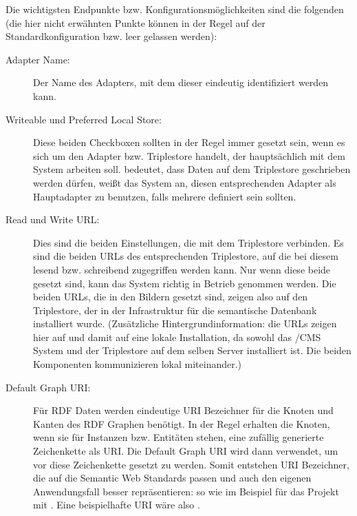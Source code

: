 Die wichtigsten Endpunkte bzw. Konfigurationsmöglichkeiten sind die folgenden (die hier nicht erwähnten Punkte können in der Regel auf der Standardkonfiguration bzw. leer gelassen werden):

\begin{description}
	\item[Adapter Name:] Der Name des Adapters, mit dem dieser eindeutig identifiziert werden kann.
	\item[Writeable und Preferred Local Store:] Diese beiden Checkboxen sollten in der Regel immer gesetzt sein, wenn es sich um den Adapter bzw. Triplestore handelt, der hauptsächlich mit dem System arbeiten soll.  bedeutet, dass Daten auf dem Triplestore geschrieben werden dürfen,  weißt das System an, diesen entsprechenden Adapter als Hauptadapter zu benutzen, falls mehrere definiert sein sollten.
	\item[Read und Write URL:] Dies sind die beiden Einstellungen, die \wisski mit dem Triplestore verbinden. Es sind die beiden URLs des entsprechenden Triplestore, auf die bei diesem lesend bzw. schreibend zugegriffen werden kann. Nur wenn diese beide gesetzt sind, kann das System richtig in Betrieb genommen werden. Die beiden URLs, die in den Bildern gesetzt sind, zeigen also auf den Triplestore, der in der Infrastruktur für die semantische Datenbank installiert wurde. (Zusätzliche Hintergrundinformation: die URLs zeigen hier auf  und damit auf eine lokale Installation, da sowohl das \wisski/CMS System und der Triplestore auf dem selben Server installiert ist. Die beiden Komponenten kommunizieren lokal miteinander.)
	\item[Default Graph URI:] Für RDF Daten werden eindeutige URI Bezeichner für die Knoten und Kanten des RDF Graphen benötigt. In der Regel erhalten die Knoten, wenn sie für Instanzen bzw. Entitäten stehen, eine zufällig generierte Zeichenkette als URI. Die Default Graph URI wird dann verwendet, um vor diese Zeichenkette gesetzt zu werden. Somit entstehen URI Bezeichner, die auf die Semantic Web Standards passen und auch den eigenen Anwendungsfall besser repräsentieren: so wie im Beispiel für das \visit Projekt mit . Eine beispielhafte URI wäre also .

\end{description}
